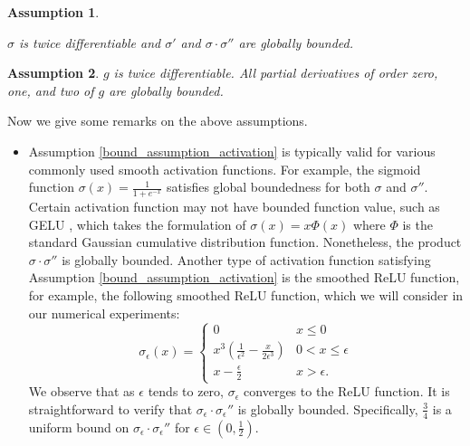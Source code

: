 \documentclass[twoside,11pt]{article}
\newtheorem{assumption}{Assumption}%
\begin{document}
\begin{assumption}\label{act-func}

 $\sigma$ is twice differentiable and $\sigma'$ and $\sigma\cdot\sigma''$ are globally bounded.
\label{bound_assumption_activation}
\end{assumption}
\begin{assumption}
 $g$ is twice differentiable. All partial derivatives of order zero, one, and two of $g$ are globally bounded.
\label{bound_assumption_bn}
\end{assumption}

\begin{remark}
Now we give some remarks on the above assumptions.
\begin{itemize}
\item[1.] Assumption \ref{bound_assumption_activation} is typically valid for various commonly used smooth activation functions.  For example, the sigmoid function $\sigma(x)=\frac{1}{1+e^{-x}}$ satisfies global boundedness for both $\sigma$ and $\sigma''$. Certain activation function may not have bounded function value, such as {GELU} \citep{hendrycks2016gaussian}, which takes the formulation of $\sigma(x)=x\Phi(x)$ where $\Phi$ is the standard Gaussian cumulative distribution function. Nonetheless, the product $\sigma\cdot\sigma''$ is globally bounded. Another type of activation function satisfying Assumption \ref{bound_assumption_activation} is the smoothed ReLU function, for example, the following smoothed ReLU function, which we will consider in our numerical experiments:
\[
\sigma_\epsilon(x) = \left\{
\begin{array}{cc}
     0 & x \le 0 \\
     x^3\left(\frac{1}{\epsilon^2}-\frac{x}{2\epsilon^3}\right) & 0 < x \le \epsilon \\
     x - \frac{\epsilon}{2} & x > \epsilon.
\end{array}\right.
\]
We observe that as $\epsilon$ tends to zero, $\sigma_\epsilon$ converges to the ReLU function. It is straightforward to verify that $\sigma_\epsilon\cdot\sigma_\epsilon''$ is globally bounded.  
Specifically, $\frac{3}{4}$ is a uniform bound on $\sigma_\epsilon\cdot\sigma_\epsilon''$ for $\epsilon\in(0,\frac{1}{2})$. 


\end{itemize}
\end{remark}
\end{document}
